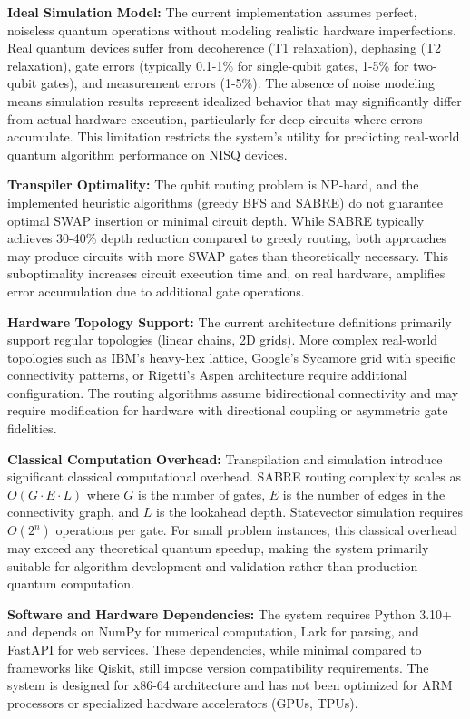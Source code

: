 \textbf{Ideal Simulation Model:} The current implementation assumes perfect, noiseless quantum operations without modeling realistic hardware imperfections. Real quantum devices suffer from decoherence (T1 relaxation), dephasing (T2 relaxation), gate errors (typically 0.1-1\% for single-qubit gates, 1-5\% for two-qubit gates), and measurement errors (1-5\%). The absence of noise modeling means simulation results represent idealized behavior that may significantly differ from actual hardware execution, particularly for deep circuits where errors accumulate. This limitation restricts the system's utility for predicting real-world quantum algorithm performance on NISQ devices.

\textbf{Transpiler Optimality:} The qubit routing problem is NP-hard, and the implemented heuristic algorithms (greedy BFS and SABRE) do not guarantee optimal SWAP insertion or minimal circuit depth. While SABRE typically achieves 30-40\% depth reduction compared to greedy routing, both approaches may produce circuits with more SWAP gates than theoretically necessary. This suboptimality increases circuit execution time and, on real hardware, amplifies error accumulation due to additional gate operations.

\textbf{Hardware Topology Support:} The current architecture definitions primarily support regular topologies (linear chains, 2D grids). More complex real-world topologies such as IBM's heavy-hex lattice, Google's Sycamore grid with specific connectivity patterns, or Rigetti's Aspen architecture require additional configuration. The routing algorithms assume bidirectional connectivity and may require modification for hardware with directional coupling or asymmetric gate fidelities.

\textbf{Classical Computation Overhead:} Transpilation and simulation introduce significant classical computational overhead. SABRE routing complexity scales as $O(G \cdot E \cdot L)$ where $G$ is the number of gates, $E$ is the number of edges in the connectivity graph, and $L$ is the lookahead depth. Statevector simulation requires $O(2^n)$ operations per gate. For small problem instances, this classical overhead may exceed any theoretical quantum speedup, making the system primarily suitable for algorithm development and validation rather than production quantum computation.

\textbf{Software and Hardware Dependencies:} The system requires Python 3.10+ and depends on NumPy for numerical computation, Lark for parsing, and FastAPI for web services. These dependencies, while minimal compared to frameworks like Qiskit, still impose version compatibility requirements. The system is designed for x86-64 architecture and has not been optimized for ARM processors or specialized hardware accelerators (GPUs, TPUs).

